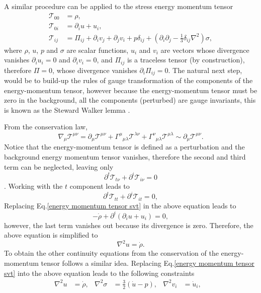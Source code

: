 \documentclass{article}
\begin{document}
A similar procedure can be applied to the stress energy momentum tensor
\begin{align}
    \label{energy momentum tensor svt}
    \mathcal{T}_{00} & = \rho, \\ 
    \mathcal{T}_{0i} & = \partial_{i}u + u_i, \\
    \mathcal{T}_{ij} & = \Pi_{ij} + \partial_{i}v_{j} + \partial_{j}v_{i} + p\delta_{ij}
    + \left(\partial_{i}\partial_{j} - \frac{1}{3}\delta_{ij}\nabla^{2}\right)\sigma,
\end{align}
where $\rho$, $u$, $p$ and $\sigma$ are scalar functions, $u_i$ and $v_i$ are vectors
whose divergence vanishes $\partial_{i}u_{i} = 0 $ and $\partial_{i}v_{i} = 0$, and $\Pi_{ij}$
is a traceless tensor (by construction), therefore $\Pi = 0$, whose divergence vanishes 
$\partial_{i}\Pi_{ij} = 0$. The natural next step, would be to build-up the rules of
gauge transformation of the components of the energy-momentum tensor, however because 
the energy-momentum tensor must be zero in the background, all the components
(perturbed) are gauge invariants, this is known as the Steward Walker lemma 
\cite{stewart1993advanced}.

From the conservation law, 
\begin{equation}
    \nabla_{\mu}\mathcal{T}^{\mu\nu} = \partial_{\mu}\mathcal{T}^{\mu\nu}
    + \Gamma^{\mu}{}_{\mu\lambda}\mathcal{T}^{\lambda\nu}
    + \Gamma^{\nu}{}_{\mu\lambda}\mathcal{T}^{\mu\lambda} \sim \partial_{\mu}\mathcal{T}^{\mu\nu}.
\end{equation}
Notice that the energy-momentum tensor is defined as a perturbation and the background
energy momentum tensor vanishes, therefore the second and third term can be neglected, leaving
only
\begin{equation}
    \partial^{t}\mathcal{T}_{t\nu} + \partial^{i}\mathcal{T}_{i\nu} = 0
\end{equation}. 
Working with the $t$ component leads to
\begin{equation}
    \partial^{t}\mathcal{T}_{tt} + \partial^{i}\mathcal{T}_{it} = 0,
\end{equation}
Replacing Eq.\eqref{energy momentum tensor svt} in the above equation leads to
\begin{equation}
    -\dot{\rho} + \partial^{i}\left(\partial_{i}u + u _ i\right) = 0,
\end{equation}
however, the last term vanishes out because its divergence is zero. Therefore, the above equation
is simplified to
\begin{equation}
    \nabla^2 u = \dot{\rho}.
\end{equation}
To obtain the other continuity equations from the conservation of the energy-momentum tensor follows
a similar idea. Replacing Eq.\eqref{energy momentum tensor svt} into the above equation leads to the following
constraints
\begin{align}
    \nabla^{2}u & = \dot{\rho}, & 
    \nabla^{2}\sigma & = \frac{3}{2}\left(\dot{u} - p\right), & 
    \nabla^{2}v_{i} & = \dot{u}_{i}, & 
\end{align}
\end{document}
